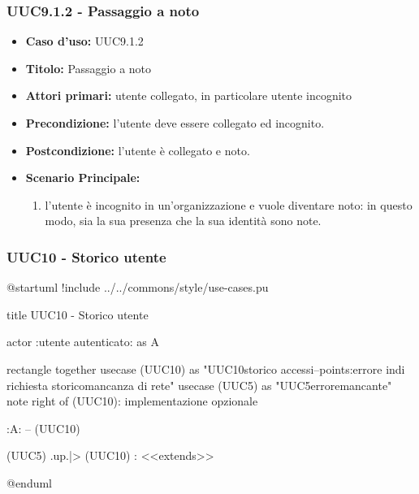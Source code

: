 \documentclass[casi-duso]{subfiles}
\begin{document}
\subsubsection{UUC9.1.2 - Passaggio a noto}%
\label{subsub:UUC9.1.2utente}
\begin{itemize}
  \item \textbf{Caso d’uso:} UUC9.1.2
  \item \textbf{Titolo:} Passaggio a noto
  \item \textbf{Attori primari:} utente collegato, in particolare utente incognito
  \item \textbf{Precondizione:} l'utente deve essere collegato ed incognito.
  \item \textbf{Postcondizione:} l'utente è collegato e noto.
  \item \textbf{Scenario Principale:}
        \begin{enumerate}
          \item l'utente è incognito in un'organizzazione e vuole diventare noto: in questo modo, sia la sua presenza che la sua identità sono note.
        \end{enumerate}
\end{itemize}

\subsubsection{UUC10 - Storico utente}%
\label{subsub:UUC10utente}

\begin{plantuml}
@startuml
!include ../../commons/style/use-cases.pu

title UUC10 - Storico utente

actor :utente autenticato: as A

rectangle {
  together {
    usecase (UUC10) as "UUC10\nVisualizzazione storico accessi\n--\nExtension points:\nVisualizzazione errore in\ncaso di richiesta storico\nin mancanza di rete"
    usecase (UUC5) as "UUC5\nVisualizzazione errore\nrete mancante"
    note right of (UUC10): implementazione opzionale
  }
}

:A: -- (UUC10)

(UUC5) .up.|> (UUC10) : <<extends>>

@enduml
\end{plantuml}
\end{document}
